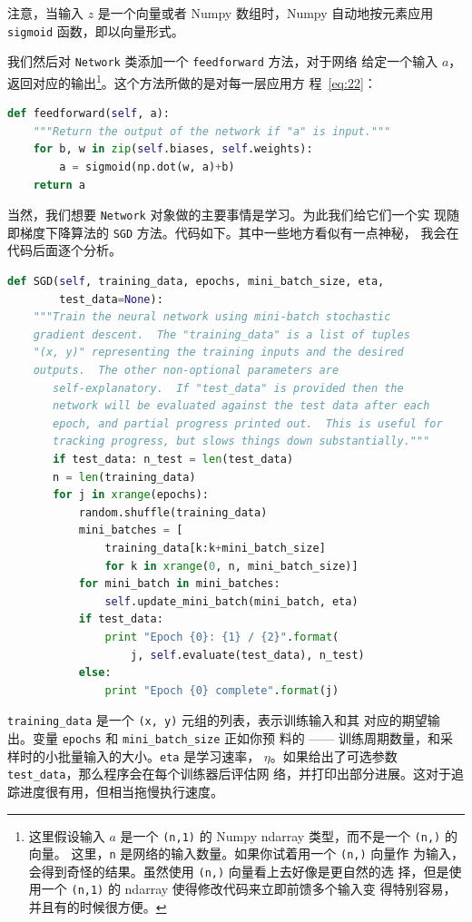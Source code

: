 注意，当输入 $z$ 是一个向量或者 Numpy 数组时，Numpy 自动地按元素应用
\lstinline!sigmoid! 函数，即以向量形式。

我们然后对 \lstinline!Network! 类添加一个 \lstinline!feedforward! 方法，对于网络
给定一个输入 $a$，返回对应的输出\footnote{这里假设输入 $a$ 是一个
  \lstinline!(n,1)! 的 Numpy ndarray 类型，而不是一个 \lstinline!(n,)! 的向量。
  这里，\lstinline!n! 是网络的输入数量。如果你试着用一个 \lstinline!(n,)! 向量作
  为输入，会得到奇怪的结果。虽然使用 \lstinline!(n,)! 向量看上去好像是更自然的选
  择，但是使用一个 \lstinline!(n,1)! 的 ndarray 使得修改代码来立即前馈多个输入变
  得特别容易，并且有的时候很方便。}。这个方法所做的是对每一层应用方
程~\eqref{eq:22}：
\begin{lstlisting}[language=Python]
def feedforward(self, a):
    """Return the output of the network if "a" is input."""
    for b, w in zip(self.biases, self.weights):
        a = sigmoid(np.dot(w, a)+b)
    return a
\end{lstlisting}

当然，我们想要 \lstinline!Network! 对象做的主要事情是学习。为此我们给它们一个实
现随即梯度下降算法的 \lstinline!SGD! 方法。代码如下。其中一些地方看似有一点神秘，
我会在代码后面逐个分析。
\begin{lstlisting}[language=Python]
def SGD(self, training_data, epochs, mini_batch_size, eta,
        test_data=None):
    """Train the neural network using mini-batch stochastic
    gradient descent.  The "training_data" is a list of tuples
    "(x, y)" representing the training inputs and the desired
    outputs.  The other non-optional parameters are
       self-explanatory.  If "test_data" is provided then the
       network will be evaluated against the test data after each
       epoch, and partial progress printed out.  This is useful for
       tracking progress, but slows things down substantially."""
       if test_data: n_test = len(test_data)
       n = len(training_data)
       for j in xrange(epochs):
           random.shuffle(training_data)
           mini_batches = [
               training_data[k:k+mini_batch_size]
               for k in xrange(0, n, mini_batch_size)]
           for mini_batch in mini_batches:
               self.update_mini_batch(mini_batch, eta)
           if test_data:
               print "Epoch {0}: {1} / {2}".format(
                   j, self.evaluate(test_data), n_test)
           else:
               print "Epoch {0} complete".format(j)
\end{lstlisting}

\lstinline!training_data! 是一个 \lstinline!(x, y)! 元组的列表，表示训练输入和其
对应的期望输出。变量 \lstinline!epochs! 和 \lstinline!mini_batch_size! 正如你预
料的 —— 训练周期数量，和采样时的小批量输入的大小。\lstinline!eta! 是学习速率，
$\eta$。如果给出了可选参数 \lstinline!test_data!，那么程序会在每个训练器后评估网
络，并打印出部分进展。这对于追踪进度很有用，但相当拖慢执行速度。

